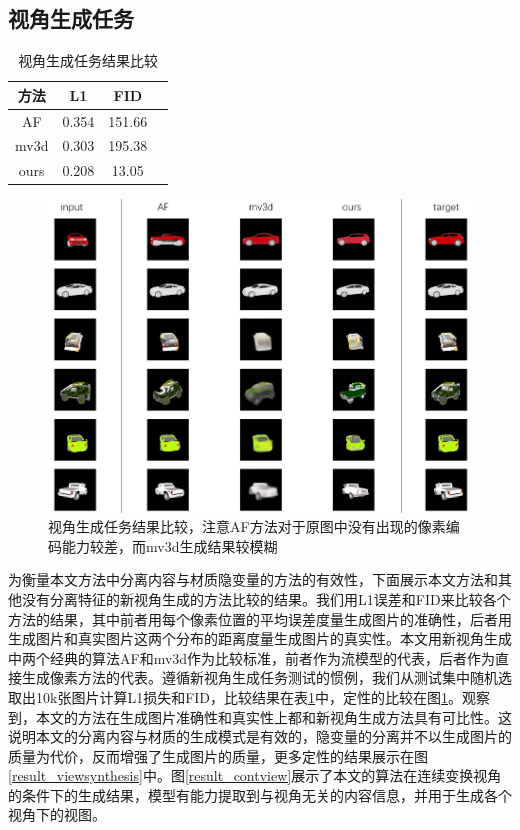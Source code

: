\documentclass[UTF8,openany,AutoFakeBold,AutoFakeSlant,cs4size]{ctexbook}
\begin{document}
\subsection{视角生成任务}

\begin{table}[h]
\small %
\centering
\caption{视角生成任务结果比较}
\label{novel_view_thesis}
\begin{tabular}{cccc} %
\toprule %
方法 & L1 & FID \\
\midrule
AF\cite{Zhou2016ViewSB} & 0.354 & 151.66 \\
mv3d\cite{TDB16a} & 0.303 & 195.38 \\
ours & 0.208 & 13.05 \\
\bottomrule
\end{tabular}
\end{table}

\begin{figure}
\centering
\includegraphics[width=\linewidth]{./images/compare_methods.png}
\caption{视角生成任务结果比较，注意AF方法对于原图中没有出现的像素编码能力较差，而mv3d生成结果较模糊}
\label{compare_methods}
\end{figure}

为衡量本文方法中分离内容与材质隐变量的方法的有效性，下面展示本文方法和其他没有分离特征的新视角生成的方法比较的结果。我们用L1误差和FID来比较各个方法的结果，其中前者用每个像素位置的平均误差度量生成图片的准确性，后者用生成图片和真实图片这两个分布的距离度量生成图片的真实性。本文用新视角生成中两个经典的算法AF\cite{Zhou2016ViewSB}和mv3d\cite{TDB16a}作为比较标准，前者作为流模型的代表，后者作为直接生成像素方法的代表。遵循新视角生成任务测试的惯例，我们从测试集中随机选取出10k张图片计算L1损失和FID，比较结果在表\ref{novel_view_thesis}中，定性的比较在图\ref{compare_methods}。观察到，本文的方法在生成图片准确性和真实性上都和新视角生成方法具有可比性。这说明本文的分离内容与材质的生成模式是有效的，隐变量的分离并不以生成图片的质量为代价，反而增强了生成图片的质量，更多定性的结果展示在图\ref{result_viewsynthesis}中。图\ref{result_contview}展示了本文的算法在连续变换视角的条件下的生成结果，模型有能力提取到与视角无关的内容信息，并用于生成各个视角下的视图。
\end{document}
